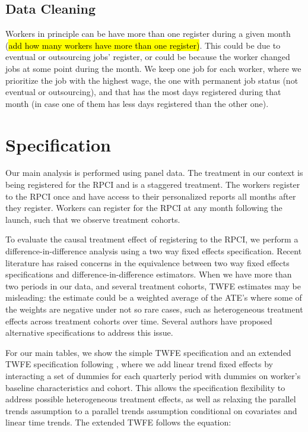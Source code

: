 \documentclass[oneside,11pt]{article}
\begin{document}
\subsection{Data Cleaning}

Workers in principle can be have more than one register during a given month (\hl{add how many workers have more than one register)}. This could be due to eventual or outsourcing jobs' register, or could be because the worker changed jobs at some point during the month. We keep one job for each worker, where we prioritize the job with the highest wage, the one with permanent job status (not eventual or outsourcing), and that has the most days registered during that month (in case one of them has less days registered than the other one).

\section{Specification}

Our main analysis is performed using panel data. The treatment in our context is being registered for the RPCI and is a staggered treatment. The workers register to the RPCI once and have access to their personalized reports all months after they register. Workers can register for the RPCI at any month following the launch, such that we observe treatment cohorts.

To evaluate the causal treatment effect of registering to the RPCI, we perform a difference-in-difference analysis using a two way fixed effects specification. Recent literature has raised concerns in the equivalence between two way fixed effects specifications and difference-in-difference estimators. When we have more than two periods in our data, and several treatment cohorts, TWFE estimates may be misleading: the estimate could be a weighted average of the ATE's where some of the weights are negative under not so rare cases, such as heterogeneous treatment effects across treatment cohorts over time. Several authors have proposed alternative specifications to address this issue. 

For our main tables, we show the simple TWFE specification and an extended TWFE specification following \cite{wooldridge2021two}, where we add linear trend fixed effects by interacting a set of dummies for each quarterly period with dummies on worker's baseline characteristics and cohort. This allows the specification flexibility to address possible heterogeneous treatment effects, as well as relaxing the parallel trends assumption to a parallel trends assumption conditional on covariates and linear time trends. The extended TWFE follows the equation:
\end{document}
